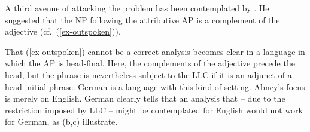 \documentclass[output=paper
  ,nobabel
  ,uniformtopskip %
]{langscibook}
\begin{document}
A third avenue of attacking the problem has been contemplated by \citet*[339]{Abney87a}. He suggested that the NP following the attributive AP is a complement of the adjective (cf.\ (\ref{ex-outspoken})).

\eal
{}\label{ex-outspoken}


\label{ex-sicher}

\label{ex-proposal}
\zl

\noindent
That (\ref{ex-outspoken}) cannot be a correct analysis becomes clear in a language in which the AP is head-final. Here, the complements of the adjective precede the head, but the phrase is nevertheless subject to the LLC if it is an adjunct of a head-initial phrase. German is a language with this kind of setting.  Abney's focus is merely on English. German clearly tells that an analysis that – due to the restriction imposed by LLC – might be contemplated for English would not work for German, as (b,c) illustrate.
\end{document}
